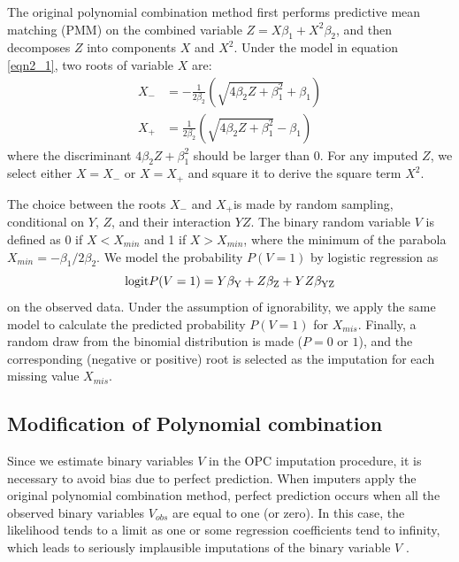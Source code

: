 	The original polynomial combination method first performs predictive mean matching (PMM) \citep{little1988missing} on the combined variable $Z = X\beta_{1} + X^2\beta_{2}$, and then decomposes $Z$ into components $X$ and $X^2$. Under the model in equation \ref{eqn2_1}, two roots of variable $X$ are:
	\begin{equation}
		\begin{array}{ll}
			X_{-} &= -\frac{1}{2\beta_{2}}(\sqrt{4\beta_{2}Z + \beta_{1}^2} + \beta_{1})\\
			X_{+} &= \frac{1}{2\beta_{2}}(\sqrt{4\beta_{2}Z + \beta_{1}^2} - \beta_{1})
		\end{array}
	\end{equation} 
	where the discriminant $4\beta_{2}Z + \beta_{1}^2$ should be larger than 0. For any imputed $Z$, we select either $X = X_{-}$ or $X = X_{+}$ and square it to derive the square term $X^2$. 
	
	The choice between the roots $X_{-}$ and $X_{+}$is made by random sampling, conditional on $Y$, $Z$, and their interaction $YZ$. The binary random variable $V$ is defined as 0 if $X < X_{min}$ and 1 if $X > X_{min}$, where the minimum of the parabola $X_{min} = -\beta_{1}/2\beta_{2}$. We model the probability $P(V = 1)$ by logistic regression as
	\begin{equation}
		\textnormal{logit} P(V = 1) = Y\beta_{\textnormal{Y}} + Z\beta_{\textnormal{Z}} + YZ\beta_{\textnormal{YZ}}
	\end{equation} 
	on the observed data. Under the assumption of ignorability, we apply the same model to calculate the predicted probability $P(V = 1)$ for $X_{mis}$. Finally, a random draw from the binomial distribution is made ($P = 0$ \textnormal{or} $1$), and the corresponding (negative or positive) root is selected as the imputation for each missing value $X_{mis}$.  
	\subsection{Modification of Polynomial combination}
	Since we estimate binary variables $V$ in the OPC imputation procedure, it is necessary to avoid bias due to perfect prediction. When imputers apply the original polynomial combination method, perfect prediction occurs when all the observed binary variables $V_{obs}$ are equal to one (or zero). In this case, the likelihood tends to a limit as one or some regression coefficients tend to infinity, which leads to seriously implausible imputations of the binary variable $V$ \citep{white2010avoiding}. 
	
